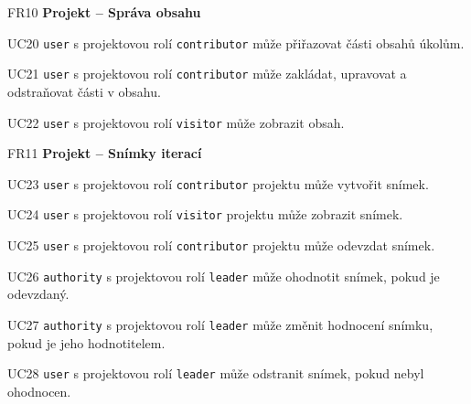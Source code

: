 \begin{dlnar}
   \item[FR10] \textbf{Projekt -- Správa obsahu}
 
   \begin{dlnar}
      \item[UC20] 
      \texttt{user} s projektovou rolí \texttt{contributor} může přiřazovat části obsahů úkolům.

      \item[UC21] 
      \texttt{user} s projektovou rolí \texttt{contributor} může zakládat, upravovat a odstraňovat části v obsahu. 

      \item[UC22] 
      \texttt{user} s projektovou rolí \texttt{visitor} může zobrazit obsah.
   \end{dlnar}
\end{dlnar}


\begin{dlnar}
   \item[FR11] \textbf{Projekt -- Snímky iterací}
 
   \begin{dlnar}
      \item[UC23]
      \texttt{user} s projektovou rolí \texttt{contributor} projektu může vytvořit snímek.

      \item[UC24] 
      \texttt{user} s projektovou rolí \texttt{visitor} projektu může zobrazit snímek.

      \item[UC25] 
      \texttt{user} s projektovou rolí \texttt{contributor} projektu může odevzdat snímek.

      \item[UC26]
      \texttt{authority} s projektovou rolí \texttt{leader} může ohodnotit snímek, pokud je odevzdaný.
      
      \item[UC27]
      \texttt{authority} s projektovou rolí \texttt{leader} může změnit hodnocení snímku, pokud je jeho hodnotitelem.

      \item[UC28]
      \texttt{user} s projektovou rolí \texttt{leader} může odstranit snímek, pokud nebyl ohodnocen.  
   \end{dlnar}
\end{dlnar}

